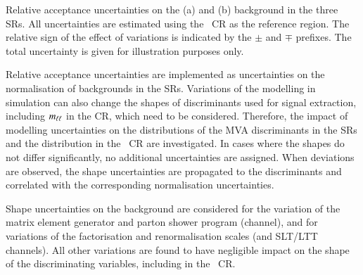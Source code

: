 \begin{table}[htbp]
  \centering

  \caption[Relative acceptance uncertainties on the \ZHF and \ttbar background
  in the SRs.]{Relative acceptance uncertainties on the \ZHF (a) and \ttbar (b)
    background in the three SRs. All uncertainties are estimated using the
    \ZHF~CR as the reference region. The relative sign of the effect of
    variations is indicated by the $\pm$ and $\mp$ prefixes. The total
    uncertainty is given for illustration purposes only.}

  \begin{subtable}[t]{0.95\textwidth}
    \centering
    \label{tab:uncertainties_zhf_extrapol}

    
  \end{subtable}

  \vspace{12pt}

  \begin{subtable}[t]{0.95\textwidth}
    \centering
    \label{tab:uncertainties_ttbar_extrapol}

    
  \end{subtable}
\end{table}

Relative acceptance uncertainties are implemented as uncertainties on the
normalisation of backgrounds in the SRs. Variations of the modelling in
simulation can also change the shapes of discriminants used for signal
extraction, including $m_{\ell\ell}$ in the \ZHF CR, which need to be
considered. Therefore, the impact of modelling uncertainties on the
distributions of the MVA discriminants in the SRs and the \mll distribution in
the \ZHF~CR are investigated. In cases where the shapes do not differ
significantly, no additional uncertainties are assigned. When deviations are
observed, the shape uncertainties are propagated to the discriminants and
correlated with the corresponding normalisation uncertainties.

Shape uncertainties on the \ZHF background are considered for the variation of
the matrix element generator and parton shower program (\hadhad channel), and
for variations of the factorisation and renormalisation scales (\hadhad and
\lephad SLT/LTT channels). All other variations are found to have negligible
impact on the shape of the discriminating variables, including \mll in the
\ZHF~CR.

